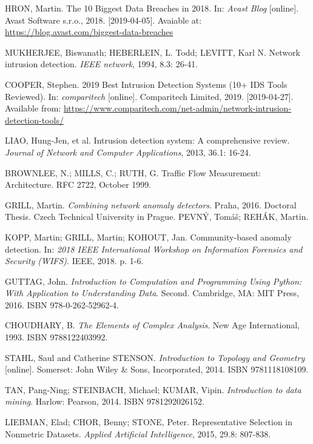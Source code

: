 \documentclass[thesis=B,english]{FITthesis}[2012/10/20]
\begin{document}
\begin{thebibliography}{99}
HRON, Martin. The 10 Biggest Data Breaches in 2018. In: \textit{Avast Blog} [online]. Avast Software s.r.o., 2018. [2019-04-05]. Avaiable at: \url{https://blog.avast.com/biggest-data-breaches}

MUKHERJEE, Biswanath; HEBERLEIN, L. Todd; LEVITT, Karl N. Network intrusion detection. \textit{IEEE network}, 1994, 8.3: 26-41.

COOPER, Stephen. 2019 Best Intrusion Detection Systems (10+ IDS Tools Reviewed). In: \textit{comparitech} [online]. Comparitech Limited, 2019. [2019-04-27]. Available from: \url{https://www.comparitech.com/net-admin/network-intrusion-detection-tools/}

LIAO, Hung-Jen, et al. Intrusion detection system: A comprehensive review. \textit{Journal of Network and Computer Applications}, 2013, 36.1: 16-24.

BROWNLEE, N.; MILLS, C.; RUTH, G. Traffic Flow Measurement: Architecture. RFC 2722, October 1999.

GRILL, Martin. \textit{Combining network anomaly detectors}. Praha, 2016. Doctoral Thesis. Czech Technical University in Prague. PEVNÝ, Tomáš; REHÁK, Martin.

KOPP, Martin; GRILL, Martin; KOHOUT, Jan. Community-based anomaly detection. In: \textit{2018 IEEE International Workshop on Information Forensics and Security (WIFS)}. IEEE, 2018. p. 1-6.

GUTTAG, John. \textit{Introduction to Computation and Programming Using Python: With Application to Understanding Data}. Second. Cambridge, MA: MIT Press, 2016. ISBN 978-0-262-52962-4.

CHOUDHARY, B. \textit{The Elements of Complex Analysis}. New Age International, 1993. ISBN 9788122403992.

STAHL, Saul and Catherine STENSON. \textit{Introduction to Topology and Geometry} [online]. Somerset: John Wiley \& Sons, Incorporated, 2014. ISBN 9781118108109.

TAN, Pang-Ning; STEINBACH, Michael; KUMAR, Vipin. \textit{Introduction to data mining}. Harlow: Pearson, 2014. ISBN 9781292026152.

LIEBMAN, Elad; CHOR, Benny; STONE, Peter. Representative Selection in Nonmetric Datasets. \textit{Applied Artificial Intelligence}, 2015, 29.8: 807-838.


\end{thebibliography}
\end{document}
